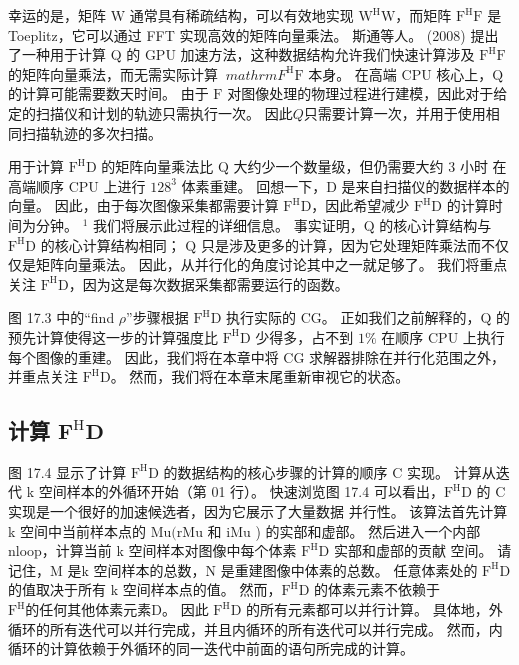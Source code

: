 幸运的是，矩阵 $\mathrm{W}$ 通常具有稀疏结构，可以有效地实现 $\mathrm{W}^{\mathrm{H}} \mathrm{W}$，而矩阵 $\mathrm{F }^{\mathrm{H}} \mathrm{F}$ 是 Toeplitz，它可以通过 FFT 实现高效的矩阵向量乘法。 斯通等人。 (2008) 提出了一种用于计算 Q 的 GPU 加速方法，这种数据结构允许我们快速计算涉及 $\mathrm{F}^{\mathrm{H}} \mathrm{F}$ 的矩阵向量乘法，而无需实际计算 $\ mathrm{F}^{\mathrm{H}} \mathrm{F}$ 本身。 在高端 CPU 核心上，$\mathrm{Q}$ 的计算可能需要数天时间。 由于 $\mathrm{F}$ 对图像处理的物理过程进行建模，因此对于给定的扫描仪和计划的轨迹只需执行一次。 因此$Q$只需要计算一次，并用于使用相同扫描轨迹的多次扫描。

用于计算 $\mathrm{F}^{\mathrm{H}} \mathrm{D}$ 的矩阵向量乘法比 $\mathrm{Q}$ 大约少一个数量级，但仍需要大约 3 小时 在高端顺序 CPU 上进行 $128^{3}$ 体素重建。 回想一下，D 是来自扫描仪的数据样本的向量。 因此，由于每次图像采集都需要计算 $\mathrm{F}^{\mathrm{H}} \mathrm{D}$，因此希望减少 $\mathrm{F}^{\mathrm{H}} \mathrm{D}$ 的计算时间为分钟。 ${ }^{1}$ 我们将展示此过程的详细信息。 事实证明，$\mathrm{Q}$ 的核心计算结构与 $\mathrm{F}^{\mathrm{H}}\mathrm{D}$ 的核心计算结构相同； $\mathrm{Q}$ 只是涉及更多的计算，因为它处理矩阵乘法而不仅仅是矩阵向量乘法。 因此，从并行化的角度讨论其中之一就足够了。 我们将重点关注 $\mathrm{F}^{\mathrm{H}} \mathrm{D}$，因为这是每次数据采集都需要运行的函数。

图 17.3 中的“find $\rho$”步骤根据 $\mathrm{F}^{\mathrm{H}} \mathrm{D}$ 执行实际的 CG。 正如我们之前解释的，$\mathrm{Q}$ 的预先计算使得这一步的计算强度比 $\mathrm{F}^{\mathrm{H}} \mathrm{D}$ 少得多，占不到 $1 \% $ 在顺序 CPU 上执行每个图像的重建。 因此，我们将在本章中将 CG 求解器排除在并行化范围之外，并重点关注 $\mathrm{F}^{\mathrm{H}} \mathrm{D}$。 然而，我们将在本章末尾重新审视它的状态。

\subsection{计算 $\mathbf{F}^{\mathrm{H}} \mathbf{D}$}
图 17.4 显示了计算 $\mathrm{F}^{\mathrm{H}} \mathrm{D}$ 的数据结构的核心步骤的计算的顺序 $\mathrm{C}$ 实现。 计算从迭代 k 空间样本的外循环开始（第 01 行）。 快速浏览图 17.4 可以看出，$\mathrm{F}^{\mathrm{H}} \mathrm{D}$ 的 $\mathrm{C}$ 实现是一个很好的加速候选者，因为它展示了大量数据 并行性。 该算法首先计算 k 空间中当前样本点的 $\mathrm{Mu}(\mathrm{rMu}$ 和 $\mathrm{iMu}$ ) 的实部和虚部。 然后进入一个内部 nloop，计算当前 k 空间样本对图像中每个体素 $\mathrm{F}^{\mathrm{H}} \mathrm{D}$ 实部和虚部的贡献 空间。 请记住，$\mathrm{M}$ 是$\mathrm{k}$ 空间样本的总数，$\mathrm{N}$ 是重建图像中体素的总数。 任意体素处的 $\mathrm{F}^{\mathrm{H}} \mathrm{D}$ 的值取决于所有 $\mathrm{k}$ 空间样本点的值。 然而，$\mathrm{F}^{\mathrm{H}} \mathrm{D}$ 的体素元素不依赖于 $\mathrm{F}^{\mathrm{H}} \mathrm{ 的任何其他体素元素 D}$。 因此 $\mathrm{F}^{\mathrm{H}} \mathrm{D}$ 的所有元素都可以并行计算。 具体地，外循环的所有迭代可以并行完成，并且内循环的所有迭代可以并行完成。 然而，内循环的计算依赖于外循环的同一迭代中前面的语句所完成的计算。

